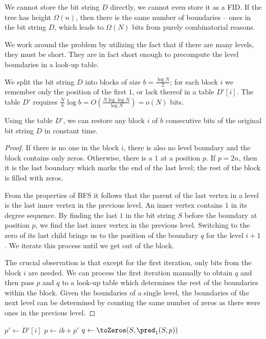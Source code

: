 We cannot store the bit string $D$ directly, we cannot even store it as a FID.
If the tree has height $\Omega(n)$, then there is the same number of boundaries -- ones in the bit string $D$, which leads to $\Omega(N)$ bits from purely combinatorial reasons.

We work around the problem by utilizing the fact that if there are many levels, they must be short.
They are in fact short enough to precompute the level boundaries in a look-up table.

We split the bit string $D$ into blocks of size $b = \frac{\log N}{2}$; for each block $i$ we remember only the position of the first $1$, or lack thereof in a table $D'[i]$.
The table $D'$ requires $\frac{N}{b} \log b = O(\frac{N \log\log N}{\log N}) = o(N)$ bits.

\begin{lemma}
	Using the table $D'$, we can restore any block $i$ of $b$ consecutive bits of the original bit string $D$ in constant time.
\end{lemma}
\begin{proof}
	If there is no one in the block $i$, there is also no level boundary and the block contains only zeros.
	Otherwise, there is a $1$ at a position $p$.
	If $p = 2n$, then it is the last boundary which marks the end of the last level; the rest of the block is filled with zeros.

	From the properties of BFS it follows that the parent of the last vertex in a level is the last inner vertex in the previous level.
	An inner vertex contains $1$ in its degree sequence.
	By finding the last $1$ in the bit string $S$ before the boundary at position $p$, we find the last inner vertex in the previous level.
	Switching to the zero of its last child brings us to the position of the boundary $q$ for the level $i+1$.
	We iterate this process until we get out of the block.
	
	The crucial observation is that except for the first iteration, only bits from the block $i$ are needed.
	We can process the first iteration manually to obtain $q$ and then pass $p$ and $q$ to a look-up table \blockOfD{} which determines the rest of the boundaries within the block.
	Given the boundaries of a single level, the boundaries of the next level can be determined by counting the same number of zeros as there were ones in the previous level.
\end{proof}

\begin{algorithm}
\begin{algorithmic}
 
	\State $p' \gets D'[i]$
	 
		\State {}
	\Else
		\State $p \gets i b + p'$
		 
			\State {} 
		\Else
			\State $q \gets \toZeros(S, \pred_1(S, p))$
			 
				\State {}
			\Else
				\State \Return{$\blockOfD[S[i b : (i + 1) b], p', q \% b]$}
			\EndIf
		\EndIf
	\EndIf
\EndFunction
\end{algorithmic}
\end{algorithm}


